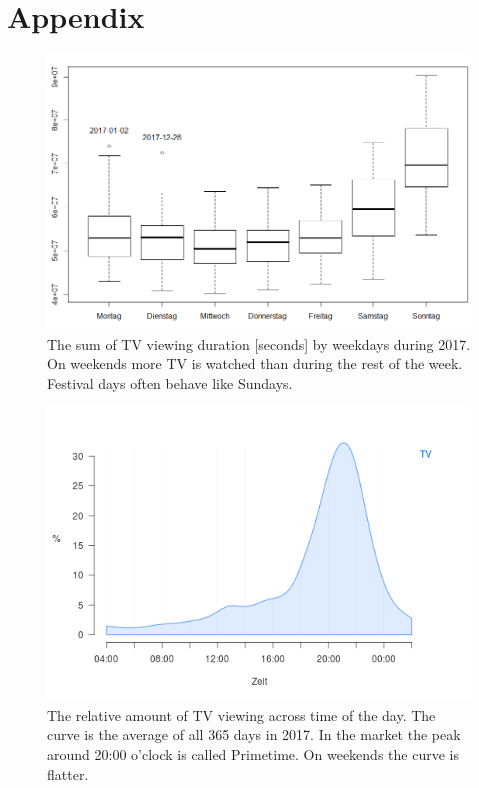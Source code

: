 \documentclass[]{article}
\begin{document}
\pagebreak

\hypertarget{appendix}{%
\section{Appendix}\label{appendix}}

\begin{figure}[H]

{\centering \includegraphics[width=0.75\linewidth]{../data/tv-week} 

}

\caption{\label{fig:fig1} The sum of TV viewing duration [seconds] by weekdays during 2017. On weekends more TV is watched than during the rest of the week. Festival days often behave like Sundays.}\label{fig:unnamed-chunk-21}
\end{figure}

\begin{figure}[H]

{\centering \includegraphics[width=0.75\linewidth]{../data/tv-day} 

}

\caption{\label{fig:fig2} The relative amount of TV viewing across time of the day. The curve is the average of all 365 days in 2017. In the market the peak around 20:00 o'clock is called Primetime. On weekends the curve is flatter.}\label{fig:unnamed-chunk-22}
\end{figure}
\end{document}
